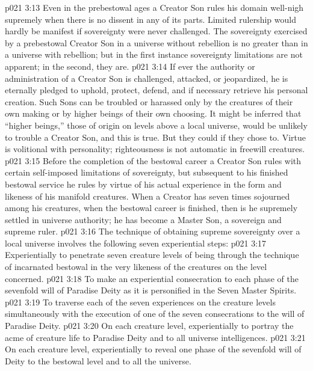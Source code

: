 \vs p021 3:13 Even in the prebestowal ages a Creator Son rules his domain well\hyp{}nigh supremely when there is no dissent in any of its parts. Limited rulership would hardly be manifest if sovereignty were never challenged. The sovereignty exercised by a prebestowal Creator Son in a universe without rebellion is no greater than in a universe with rebellion; but in the first instance sovereignty limitations are not apparent; in the second, they are.
\vs p021 3:14 If ever the authority or administration of a Creator Son is challenged, attacked, or jeopardized, he is eternally pledged to uphold, protect, defend, and if necessary retrieve his personal creation. Such Sons can be troubled or harassed only by the creatures of their own making or by higher beings of their own choosing. It might be inferred that “higher beings,” those of origin on levels above a local universe, would be unlikely to trouble a Creator Son, and this is true. But they could if they chose to. Virtue is volitional with personality; righteousness is not automatic in freewill creatures.
\vs p021 3:15 Before the completion of the bestowal career a Creator Son rules with certain self\hyp{}imposed limitations of sovereignty, but subsequent to his finished bestowal service he rules by virtue of his actual experience in the form and likeness of his manifold creatures. When a Creator has seven times sojourned among his creatures, when the bestowal career is finished, then is he supremely settled in universe authority; he has become a Master Son, a sovereign and supreme ruler.
\vs p021 3:16 \pc The technique of obtaining supreme sovereignty over a local universe involves the following seven experiential steps:
\vs p021 3:17 \pc {}\bibnobreakspace Experientially to penetrate seven creature levels of being through the technique of incarnated bestowal in the very likeness of the creatures on the level concerned.
\vs p021 3:18 \pc {}\bibnobreakspace To make an experiential consecration to each phase of the sevenfold will of Paradise Deity as it is personified in the Seven Master Spirits.
\vs p021 3:19 \pc {}\bibnobreakspace To traverse each of the seven experiences on the creature levels simultaneously with the execution of one of the seven consecrations to the will of Paradise Deity.
\vs p021 3:20 \pc {}\bibnobreakspace On each creature level, experientially to portray the acme of creature life to Paradise Deity and to all universe intelligences.
\vs p021 3:21 \pc {}\bibnobreakspace On each creature level, experientially to reveal one phase of the sevenfold will of Deity to the bestowal level and to all the universe.
